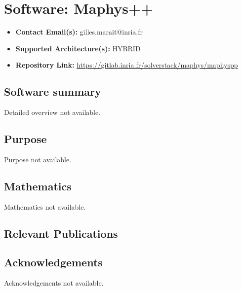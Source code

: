 \section{Software: Maphys++}
\label{sec:Maphys++:software}



\begin{itemize}
    \item \textbf{Contact Email(s):} gilles.marait@inria.fr
    \item \textbf{Supported Architecture(s):} HYBRID
    \item \textbf{Repository Link:} \href{https://gitlab.inria.fr/solverstack/maphys/maphyspp}{https://gitlab.inria.fr/solverstack/maphys/maphyspp}
\end{itemize}

\subsection{Software summary}
\label{sec:Maphys++:summary}
Detailed overview not available.



\subsection{Purpose}
\label{sec:Maphys++:purpose}
Purpose not available.



\subsection{Mathematics}
\label{sec:Maphys++:mathematics}
Mathematics not available.


\subsection{Relevant Publications}
\label{sec:Maphys++:publications}

\subsection{Acknowledgements}
\label{sec::Maphys++:acknowledgements}

Acknowledgements not available.



